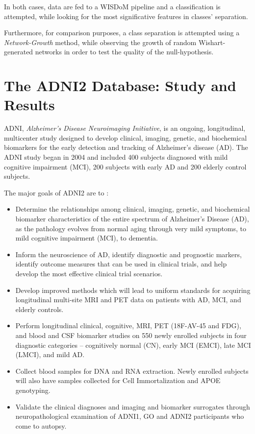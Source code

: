 \documentclass[12pt,openright,twoside,a4paper]{book}
\begin{document}
In both cases, data are fed to a WISDoM pipeline and a classification is attempted, while looking for the most significative features in classes' separation.

Furthermore, for comparison purposes, a class separation is attempted using a \textit{Network-Growth} method, while observing  the growth of random Wishart-generated networks in order to test the quality of the null-hypothesis.
\clearpage

\section{The ADNI2 Database: Study and Results}

ADNI, \textit{Alzheimer's Disease Neuroimaging Initiative}, is an ongoing, longitudinal, multicenter study designed to develop clinical, imaging, genetic, and biochemical biomarkers for the early detection and tracking of Alzheimer’s disease (AD). The ADNI study began in 2004 and included 400 subjects diagnosed with mild cognitive impairment (MCI), 200 subjects with early AD and 200 elderly control subjects.

The major goals of ADNI2 are to \cite{Adni}:
\begin{itemize}
\item Determine the relationships among clinical, imaging, genetic, and biochemical biomarker characteristics of the entire spectrum of Alzheimer’s Disease (AD), as the pathology evolves from normal aging through very mild symptoms, to mild cognitive impairment (MCI), to dementia.

\item Inform the neuroscience of AD, identify diagnostic and prognostic markers, identify outcome measures that can be used in clinical trials, and help develop the most effective clinical trial scenarios.

\item Develop improved methods which will lead to uniform standards for acquiring longitudinal multi-site MRI and PET data on patients with AD, MCI, and elderly controls.

\item Perform longitudinal clinical, cognitive, MRI, PET (18F-AV-45 and
FDG), and blood and CSF biomarker studies on 550 newly enrolled
subjects in four diagnostic categories – cognitively normal (CN),
early MCI (EMCI), late MCI (LMCI), and mild AD. 

\item Collect blood samples for DNA and RNA extraction. Newly enrolled subjects will also have samples collected for Cell Immortalization and APOE genotyping.

\item Validate the clinical diagnoses and imaging and biomarker surrogates through neuropathological examination of ADNI1, GO and ADNI2 participants who come to autopsy.

\end{itemize}
\end{document}
